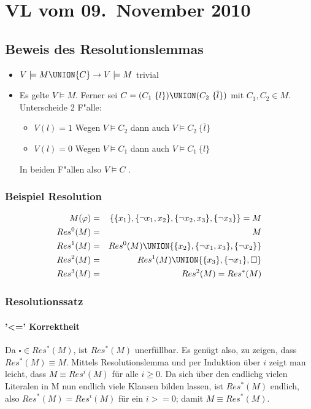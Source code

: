\section{VL vom 09.~November 2010}

\subsection{Beweis des Resolutionslemmas}

\begin{itemize}
\item $V \models M \UNION \{C\} \rightarrow V \models  M$ trivial \\
\item Es gelte $V \models M$. Ferner sei $C = (C_1\ \{l\}) \UNION (C_2\ \{\overline{l}\})$ mit $C_1,C_2 \in M$. \\ Unterscheide 2 F"alle:
\begin{itemize}
    \item $V(l) = 1$ Wegen $V \models C_2$ dann auch $V \models C_2\ \{\overline{l}\}$ \\
    \item $V(l) = 0$ Wegen $V \models C_1$ dann auch $V \models C_1\ \{l\}$ \\
\end{itemize}
In beiden F"allen also $V \models C$ .
\end{itemize}

\subsubsection{Beispiel Resolution}

\begin{eqnarray*}
M(\varphi) &=& \{ \{x_1\}, \{\neg x_1, x_2\}, \{\neg x_2, x_3\}, \{\neg x_3\} \} = M \\
Res^0(M) &=& M \\
Res^1(M) &=& Res^0(M) \UNION \{ \{x_2\}, \{\neg x_1, x_3\}, \{\neg x_2\} \} \\
Res^2(M) &=& Res^1(M) \UNION \{ \{x_3\}, \{\neg x_1\}, \square \} \\
Res^3(M) &=& Res^2(M) = Res^*(M)
\end{eqnarray*}

\subsubsection{Resolutionssatz}

\paragraph[]{'<=' Korrektheit}
Da $\square \in Res^*(M)$, ist $Res^*(M)$ unerfüllbar. Es genügt also, zu zeigen, dass $Res^*(M) \equiv M$. Mittels Resolutionslemma und per Induktion über $i$ zeigt man leicht, dass $M \equiv Res^i(M)$ für alle $i \geq 0$. Da sich über den endlichg vielen Literalen in M nun endlich viele Klausen bilden lassen, ist $Res^*(M)$ endlich, also $Res^*(M) = Res^i(M)$ für ein $i >= 0$; damit $M \equiv Res^*(M)$.

